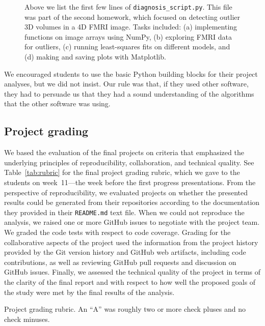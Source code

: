 \begin{figure}
\centering

\caption{Above we list the first few lines of \texttt{diagnosis\_script.py}.
This file was part of the second homework, which focused on detecting outlier
3D volumes in a 4D FMRI image.  Tasks included:
(a) implementing functions on image arrays using NumPy,
(b) exploring FMRI data for outliers,
(c) running least-squares fits on different models, and
(d) making and saving plots with Matplotlib.}\label{fig:diagnosis_script}
\end{figure}

We encouraged students to use the basic Python building blocks for their
project analyses, but we did not insist.  Our rule was that, if they used
other software, they had to persuade us that they had a sound understanding of
the algorithms that the other software was using.

\subsection{Project grading}

We based the evaluation of the final projects on criteria that emphasized the
underlying principles of reproducibility, collaboration, and technical
quality.
See Table~\ref{tab:rubric} for the final project grading rubric, which we
gave to the students on week~11---the week before the first progress
presentations.
From the perspective of reproducibility, we evaluated projects on whether the
presented results could be generated from their repositories according to the
documentation they provided in their \texttt{README.md} text file.  When we
could not reproduce the analysis, we raised one or more GitHub issues to
negotiate with the project team.
We graded the code tests with respect to code coverage.
Grading for the collaborative aspects of the project used the information
from the project history provided by the Git version history and GitHub web
artifacts, including code contributions, as well as reviewing GitHub
pull requests and discussion on GitHub issues.
Finally, we assessed the technical quality of the project in terms of
the clarity of the final report and with respect to how well the proposed
goals of the study were met by the final results of the analysis.

\begin{table}
\centering
\begin{tiny}

\caption{Project grading rubric.
An ``A'' was roughly two or more check pluses and no check minuses.}
\label{tab:rubric}
\end{tiny}
\end{table}

